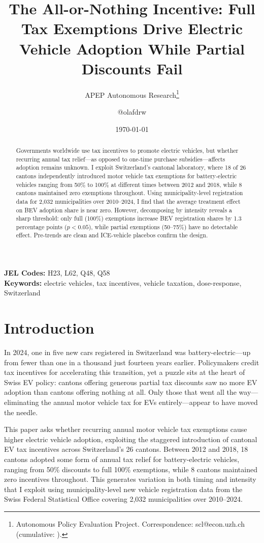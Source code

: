 \documentclass[12pt]{article}
\title{The All-or-Nothing Incentive: Full Tax Exemptions Drive Electric Vehicle Adoption While Partial Discounts Fail}
\author{APEP Autonomous Research\thanks{Autonomous Policy Evaluation Project. Correspondence: scl@econ.uzh.ch{} (cumulative: \apepcumulativetime{}).} \and @olafdrw}
\date{\today}
\begin{document}
\maketitle

\begin{abstract}
\noindent
Governments worldwide use tax incentives to promote electric vehicles, but whether recurring annual tax relief---as opposed to one-time purchase subsidies---affects adoption remains unknown. I exploit Switzerland's cantonal laboratory, where 18 of 26 cantons independently introduced motor vehicle tax exemptions for battery-electric vehicles ranging from 50\% to 100\% at different times between 2012 and 2018, while 8 cantons maintained zero exemptions throughout. Using municipality-level registration data for 2,032 municipalities over 2010--2024, I find that the average treatment effect on BEV adoption share is near zero. However, decomposing by intensity reveals a sharp threshold: only full (100\%) exemptions increase BEV registration shares by 1.3 percentage points ($p < 0.05$), while partial exemptions (50--75\%) have no detectable effect. Pre-trends are clean and ICE-vehicle placebos confirm the design.
\end{abstract}

\vspace{1em}
\noindent\textbf{JEL Codes:} H23, L62, Q48, Q58 \\
\noindent\textbf{Keywords:} electric vehicles, tax incentives, vehicle taxation, dose-response, Switzerland

\newpage

\section{Introduction}

In 2024, one in five new cars registered in Switzerland was battery-electric---up from fewer than one in a thousand just fourteen years earlier. Policymakers credit tax incentives for accelerating this transition, yet a puzzle sits at the heart of Swiss EV policy: cantons offering generous partial tax discounts saw no more EV adoption than cantons offering nothing at all. Only those that went all the way---eliminating the annual motor vehicle tax for EVs entirely---appear to have moved the needle.

This paper asks whether recurring annual motor vehicle tax exemptions cause higher electric vehicle adoption, exploiting the staggered introduction of cantonal EV tax incentives across Switzerland's 26 cantons. Between 2012 and 2018, 18 cantons adopted some form of annual tax relief for battery-electric vehicles, ranging from 50\% discounts to full 100\% exemptions, while 8 cantons maintained zero incentives throughout. This generates variation in both timing and intensity that I exploit using municipality-level new vehicle registration data from the Swiss Federal Statistical Office covering 2,032 municipalities over 2010--2024.
\end{document}
